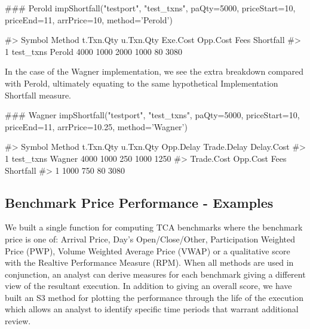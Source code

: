 \begin{Schunk}
\begin{Sinput}
### Perold
impShortfall("testport", "test_txns",
          paQty=5000,
          priceStart=10,
          priceEnd=11,
          arrPrice=10,
          method='Perold')
\end{Sinput}
\begin{Soutput}
#>      Symbol Method t.Txn.Qty u.Txn.Qty Exe.Cost Opp.Cost Fees Shortfall
#> 1 test_txns Perold      4000      1000     2000     1000   80      3080
\end{Soutput}
\end{Schunk}

In the case of the Wagner implementation, we see the extra breakdown
compared with Perold, ultimately equating to the same hypothetical
Implementation Shortfall measure.

\begin{Schunk}
\begin{Sinput}
### Wagner
impShortfall("testport", "test_txns",
          paQty=5000,
          priceStart=10,
          priceEnd=11,
          arrPrice=10.25,
          method='Wagner')
\end{Sinput}
\begin{Soutput}
#>      Symbol Method t.Txn.Qty u.Txn.Qty Opp.Delay Trade.Delay Delay.Cost
#> 1 test_txns Wagner      4000      1000       250        1000       1250
#>   Trade.Cost Opp.Cost Fees Shortfall
#> 1       1000      750   80      3080
\end{Soutput}
\end{Schunk}

\hypertarget{benchmark-price-performance---examples}{%
\subsection{Benchmark Price Performance -
Examples}\label{benchmark-price-performance---examples}}

We built a single function for computing TCA benchmarks where the
benchmark price is one of: Arrival Price, Day's Open/Close/Other,
Participation Weighted Price (PWP), Volume Weighted Average Price (VWAP)
or a qualitative score with the Realtive Performance Measure (RPM). When
all methods are used in conjunction, an analyst can derive measures for
each benchmark giving a different view of the resultant execution. In
addition to giving an overall score, we have built an S3 method for
plotting the performance through the life of the execution which allows
an analyst to identify specific time periods that warrant additional
review.

